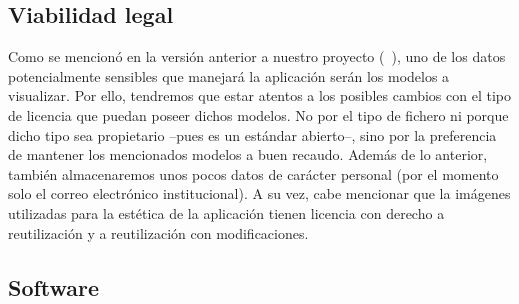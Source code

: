 \subsection{Viabilidad legal}
Como se mencionó en la versión anterior a nuestro proyecto (~\cite{github:alberto-viewer}), uno de los datos potencialmente sensibles que manejará la aplicación serán los modelos a visualizar. Por ello, tendremos que estar atentos a los posibles cambios con el tipo de licencia que puedan poseer dichos modelos. No por el tipo de fichero ni porque dicho tipo sea propietario --pues es un estándar abierto--, sino por la preferencia de mantener los mencionados modelos a buen recaudo. Además de lo anterior, también almacenaremos unos pocos datos de carácter personal (por el momento solo el correo electrónico institucional).
A su vez, cabe mencionar que la imágenes utilizadas para la estética de la aplicación tienen licencia con derecho a reutilización y a reutilización con modificaciones.

\subsection{Software}